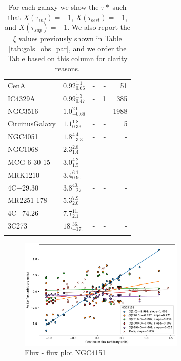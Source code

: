 \begin{longtable}{llrrr}
CenA                   &      $ 0.92_{0.66}^{1.1} $ &       - &        - &      51 \\
IC4329A                &      $ 0.99_{0.47}^{1.3} $ &       - &        1 &     385 \\
NGC3516                &      $ 1.0_{-0.68}^{2.0} $ &       - &        - &    1988 \\
CircinusGalaxy         &       $ 1.1_{0.33}^{1.8} $ &       - &        - &       5 \\
NGC4051                &       $ 1.8_{-3.3}^{4.4} $ &       - &        - &       - \\
NGC1068                &        $ 2.3_{1.4}^{2.8} $ &       - &        - &       - \\
MCG-6-30-15            &        $ 3.0_{1.5}^{4.2} $ &       - &        - &       - \\
MRK1210                &       $ 3.4_{0.90}^{6.1} $ &       - &        - &       - \\
4C+29.30               &       $ 3.8_{-27.}^{40.} $ &       - &        - &       - \\
MR2251-178             &        $ 5.3_{2.0}^{7.9} $ &       - &        - &       - \\
4C+74.26               &        $ 7.7_{2.1}^{11.} $ &       - &        - &       - \\
3C273                  &       $ 18._{-17.}^{36.} $ &       - &        - &       - \\
\hline
\caption{For each galaxy we show the $\tau*$ such that $X(\tau_{inf})=-1$, $X(\tau_{best})=-1$, and $X(\tau_{sup})=-1$. We also report the $\xi$ values previously shown in Table \ref{tab:gals_obs_par}, and we order the Table based on this column for clarity reasons.}\\
\end{longtable}

\begin{figure}
\begin{center}
    {
  \includegraphics[width=0.7\textwidth]{Figs/Chapter5/NGC4151/Flux_flux_NGC4151.pdf} \hfill 
  \caption{Flux - flux plot NGC4151}
    \label{fig:Flux-flux_NGC4151}
  }
\end{center}
\end{figure}

